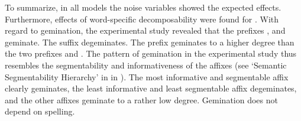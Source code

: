 To summarize, in all models the noise variables showed the expected effects. Furthermore, effects of word-specific decomposability were found for . 
With regard to gemination, the experimental study revealed that the prefixes ,  and  geminate. The suffix  degeminates. 
The prefix  geminates to a higher degree than the two prefixes and . The pattern of gemination in the experimental study thus resembles the segmentability and informativeness of the affixes (see `Semantic Segmentability Hierarchy' in  in ). The most informative and segmentable affix  clearly geminates, the least informative and least segmentable affix  degeminates, and the other affixes geminate to a rather low degree. Gemination does not depend on spelling. 


